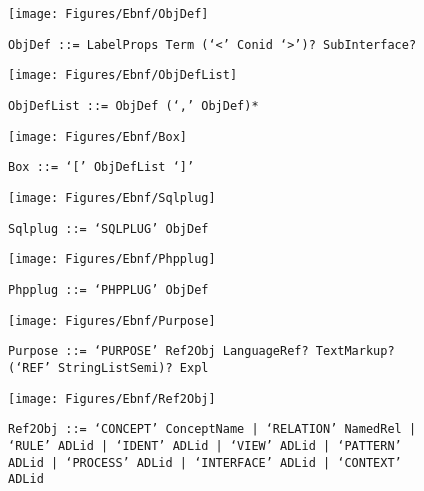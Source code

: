  \begin{figure}[H]
  \centering
  \texttt{[image: Figures/Ebnf/ObjDef]}
  \caption*{\texttt{ObjDef \small::=  LabelProps Term (`<' Conid `>')? SubInterface?}}
  \label{fig:ebnf-ObjDef}
 \end{figure}

 \begin{figure}[H]
  \centering
  \texttt{[image: Figures/Ebnf/ObjDefList]}
  \caption*{\texttt{ObjDefList \small::=  ObjDef (`,' ObjDef)*}}
  \label{fig:ebnf-ObjDefList}
 \end{figure}

 \begin{figure}[H]
  \centering
  \texttt{[image: Figures/Ebnf/Box]}
  \caption*{\texttt{Box \small::=  `[' ObjDefList `]'}}
  \label{fig:ebnf-Box}
 \end{figure}

 \begin{figure}[H]
  \centering
  \texttt{[image: Figures/Ebnf/Sqlplug]}
  \caption*{\texttt{Sqlplug \small::=  `SQLPLUG' ObjDef}}
  \label{fig:ebnf-Sqlplug}
 \end{figure}

 \begin{figure}[H]
  \centering
  \texttt{[image: Figures/Ebnf/Phpplug]}
  \caption*{\texttt{Phpplug \small::=  `PHPPLUG' ObjDef}}
  \label{fig:ebnf-Phpplug}
 \end{figure}

 \begin{figure}[H]
  \centering
  \texttt{[image: Figures/Ebnf/Purpose]}
  \caption*{\texttt{Purpose \small::=  `PURPOSE' Ref2Obj LanguageRef? TextMarkup? (`REF' StringListSemi)? Expl}}
  \label{fig:ebnf-Purpose}
 \end{figure}

 \begin{figure}[H]
  \centering
  \texttt{[image: Figures/Ebnf/Ref2Obj]}
  \caption*{\texttt{Ref2Obj \small::=  `CONCEPT' ConceptName | `RELATION' NamedRel | `RULE' ADLid | `IDENT' ADLid | `VIEW' ADLid | `PATTERN' ADLid | `PROCESS' ADLid | `INTERFACE' ADLid | `CONTEXT' ADLid}}
  \label{fig:ebnf-Ref2Obj}
 \end{figure}

